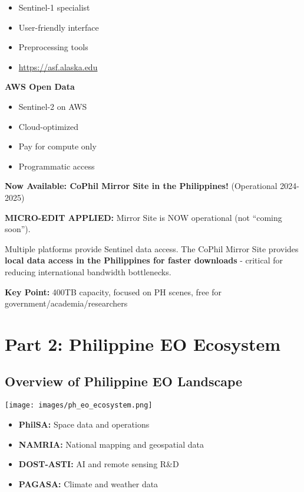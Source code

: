 \documentclass[
  letterpaper,
  DIV=11,
  numbers=noendperiod]{scrartcl}
\providecommand{\tightlist}{%
  \setlength{\itemsep}{0pt}\setlength{\parskip}{0pt}}
\begin{document}
\begin{itemize}
\tightlist
\item
  Sentinel-1 specialist
\item
  User-friendly interface
\item
  Preprocessing tools
\item
  \url{https://asf.alaska.edu}
\end{itemize}

\textbf{AWS Open Data}

\begin{itemize}
\tightlist
\item
  Sentinel-2 on AWS
\item
  Cloud-optimized
\item
  Pay for compute only
\item
  Programmatic access
\end{itemize}

\textbf{Now Available: CoPhil Mirror Site in the Philippines!}
(Operational 2024-2025)

\textbf{MICRO-EDIT APPLIED:} Mirror Site is NOW operational (not
``coming soon'').

Multiple platforms provide Sentinel data access. The CoPhil Mirror Site
provides \textbf{local data access in the Philippines for faster
downloads} - critical for reducing international bandwidth bottlenecks.

\textbf{Key Point:} 400TB capacity, focused on PH scenes, free for
government/academia/researchers

\section{Part 2: Philippine EO
Ecosystem}\label{part-2-philippine-eo-ecosystem}

\subsection{Overview of Philippine EO
Landscape}\label{overview-of-philippine-eo-landscape}

\begin{center}
\texttt{[image: images/ph\_eo\_ecosystem.png]}
\end{center}

\begin{itemize}
\tightlist
\item
  \textbf{PhilSA:} Space data and operations
\item
  \textbf{NAMRIA:} National mapping and geospatial data
\item
  \textbf{DOST-ASTI:} AI and remote sensing R\&D
\item
  \textbf{PAGASA:} Climate and weather data
\end{itemize}
\end{document}
